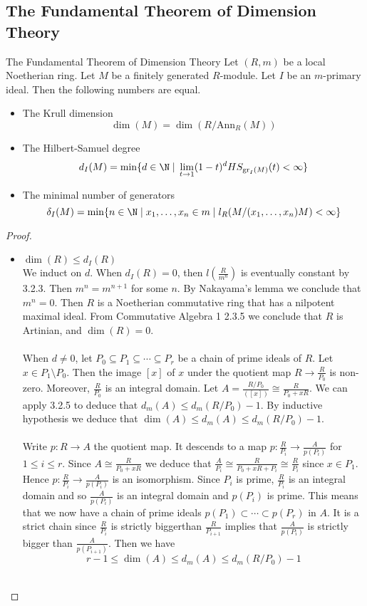 \documentclass[a4paper]{article}
\begin{document}
\subsection{The Fundamental Theorem of Dimension Theory}
\begin{thm}{The Fundamental Theorem of Dimension Theory}{} Let $(R,m)$ be a local Noetherian ring. Let $M$ be a finitely generated $R$-module. Let $I$ be an $m$-primary ideal. Then the following numbers are equal. 
\begin{itemize}
\item The Krull dimension $$\dim(M)=\dim(R/\text{Ann}_R(M))$$
\item The Hilbert-Samuel degree $$d_I(M)=\min\{d\in\N\;|\;\lim_{t\to 1}(1-t)^dHS_{\text{gr}_I(M)}(t)<\infty\}$$
\item The minimal number of generators $$\delta_I(M)=\min\{n\in\N\;|\;x_1,\dots,x_n\in m\;|\;l_R(M/(x_1,\dots,x_n)M)<\infty\}$$
\end{itemize} \tcbline
\begin{proof}~\\
\begin{itemize}
\item $\dim(R)\leq d_I(R)$\\
We induct on $d$. When $d_I(R)=0$, then $l\left(\frac{R}{m^n}\right)$ is eventually constant by 3.2.3. Then $m^n=m^{n+1}$ for some $n$. By Nakayama's lemma we conclude that $m^n=0$. Then $R$ is a Noetherian commutative ring that has a nilpotent maximal ideal. From Commutative Algebra 1 2.3.5 we conclude that $R$ is Artinian, and $\dim(R)=0$. \\~\\

When $d\neq 0$, let $P_0\subseteq P_1\subseteq\cdots\subseteq P_r$ be a chain of prime ideals of $R$. Let $x\in P_1\setminus P_0$. Then the image $[x]$ of $x$ under the quotient map $R\to\frac{R}{P_0}$ is non-zero. Moreover, $\frac{R}{P_0}$ is an integral domain. Let $A=\frac{R/P_0}{([x])}\cong\frac{R}{P_0+xR}$. We can apply 3.2.5 to deduce that $d_m(A)\leq d_m(R/P_0)-1$. By inductive hypothesis we deduce that $\dim(A)\leq d_m(A)\leq d_m(R/P_0)-1$. \\~\\

Write $p:R\to A$ the quotient map. It descends to a map $p:\frac{R}{P_i}\to\frac{A}{p(P_i)}$ for $1\leq i\leq r$. Since $A\cong\frac{R}{P_0+xR}$ we deduce that $\frac{A}{P_i}\cong\frac{R}{P_0+xR+P_i}\cong\frac{R}{P_i}$ since $x\in P_1$. Hence $p:\frac{R}{P_i}\to\frac{A}{p(P_i)}$ is an isomorphism. Since $P_i$ is prime, $\frac{R}{P_i}$ is an integral domain and so $\frac{A}{p(P_i)}$ is an integral domain and $p(P_i)$ is prime. This means that we now have a chain of prime ideals $p(P_1)\subset\cdots\subset p(P_r)$ in $A$. It is a strict chain since $\frac{R}{P_i}$ is strictly biggerthan $\frac{R}{P_{i+1}}$ implies that $\frac{A}{p(P_i)}$ is strictly bigger than $\frac{A}{p(P_{i+1})}$. Then we have $$r-1\leq\dim(A)\leq d_m(A)\leq d_m(R/P_0)-1$$~\\


\end{itemize}
\end{proof}
\end{thm}
\end{document}

